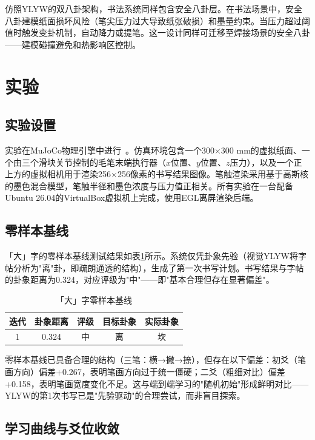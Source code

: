 \documentclass[12pt,a4paper]{article}
\begin{document}
仿照YLYW的双八卦架构，书法系统同样包含安全八卦层。在书法场景中，安全八卦建模纸面损坏风险（笔尖压力过大导致纸张破损）和墨量约束。当压力超过阈值时触发变卦机制，自动降力或提笔。这一设计同样可迁移至焊接场景的安全八卦——建模碰撞避免和热影响区控制。

\section{实验}

\subsection{实验设置}

实验在MuJoCo物理引擎中进行~\cite{todorov2012mujoco}。仿真环境包含一个300×300 mm的虚拟纸面、一个由三个滑块关节控制的毛笔末端执行器（$x$位置、$y$位置、$z$压力），以及一个正上方的虚拟相机用于渲染256×256像素的书写结果图像。笔触渲染采用基于高斯核的墨色混合模型，笔触半径和墨色浓度与压力值正相关。所有实验在一台配备Ubuntu 26.04的VirtualBox虚拟机上完成，使用EGL离屏渲染后端。

\subsection{零样本基线}

「大」字的零样本基线测试结果如表\ref{tab:baseline}所示。系统仅凭卦象先验（视觉YLYW将字帖分析为"离"卦，即疏朗通透的结构），生成了第一次书写计划。书写结果与字帖的卦象距离为0.324，对应评级为"中"——即"基本合理但存在显著偏差"。

\begin{table}[htbp]
\centering
\caption{「大」字零样本基线}
\label{tab:baseline}
\begin{tabular}{ccccc}
\toprule
迭代 & 卦象距离 & 评级 & 目标卦象 & 实际卦象 \\
\midrule
1 & 0.324 & 中 & 离 & 坎 \\
\bottomrule
\end{tabular}
\end{table}

零样本基线已具备合理的结构（三笔：横→撇→捺），但存在以下偏差：初爻（笔画方向）偏差+0.267，表明笔画方向过于统一僵硬；二爻（粗细对比）偏差+0.158，表明笔画宽度变化不足。这与端到端学习的"随机初始"形成鲜明对比——YLYW的第1次书写已是"先验驱动"的合理尝试，而非盲目探索。

\subsection{学习曲线与爻位收敛}
\end{document}
